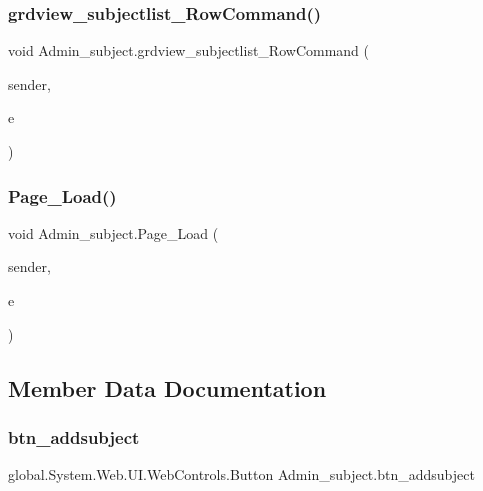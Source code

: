 \subsubsection{\texorpdfstring{grdview\_subjectlist\_RowCommand()}{grdview\_subjectlist\_RowCommand()}}
{\footnotesize\ttfamily void Admin\+\_\+subject.\+grdview\+\_\+subjectlist\+\_\+\+Row\+Command (\begin{DoxyParamCaption}\item[{object}]{sender,  }\item[{Grid\+View\+Command\+Event\+Args}]{e }\end{DoxyParamCaption})\hspace{0.3cm}{\ttfamily [protected]}}

\mbox{\label{class_admin__subject_a27d58632afbcc5e4d08398c0a6ef1c39}} 
\subsubsection{\texorpdfstring{Page\_Load()}{Page\_Load()}}
{\footnotesize\ttfamily void Admin\+\_\+subject.\+Page\+\_\+\+Load (\begin{DoxyParamCaption}\item[{object}]{sender,  }\item[{Event\+Args}]{e }\end{DoxyParamCaption})\hspace{0.3cm}{\ttfamily [protected]}}



\subsection{Member Data Documentation}
\mbox{\label{class_admin__subject_a1816029ef09c07c5754fbf0fb556fd8f}} 
\subsubsection{\texorpdfstring{btn\_addsubject}{btn\_addsubject}}
{\footnotesize\ttfamily global.\+System.\+Web.\+U\+I.\+Web\+Controls.\+Button Admin\+\_\+subject.\+btn\+\_\+addsubject\hspace{0.3cm}{\ttfamily [protected]}}



